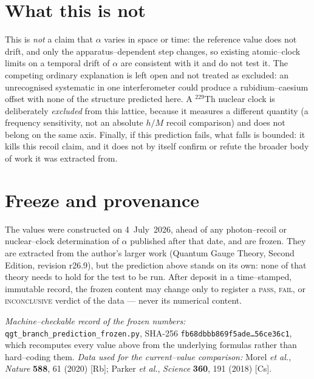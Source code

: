 \documentclass[11pt]{article}
\begin{document}
\section{What this is not}

This is \emph{not} a claim that $\alpha$ varies in space or time: the reference
value does not drift, and only the apparatus--dependent step changes, so existing
atomic--clock limits on a temporal drift of $\alpha$ are consistent with it and do
not test it. The competing ordinary explanation is left open and not treated as
excluded: an unrecognised systematic in one interferometer could produce a
rubidium--caesium offset with none of the structure predicted here. A $^{229}$Th
nuclear clock is deliberately \emph{excluded} from this lattice, because it
measures a different quantity (a frequency sensitivity, not an absolute
$h/M$ recoil comparison) and does not belong on the same axis. Finally, if this
prediction fails, what falls is bounded: it kills this recoil claim, and it does
not by itself confirm or refute the broader body of work it was extracted from.

\section*{Freeze and provenance}

The values were constructed on 4~July~2026, ahead of any photon--recoil or
nuclear--clock determination of $\alpha$ published after that date, and are
frozen. They are extracted from the author's larger work (Quantum Gauge Theory,
Second Edition, revision r26.9), but the prediction above stands on its own: none
of that theory needs to hold for the test to be run. After deposit in a
time--stamped, immutable record, the frozen content may change only to register a
\textsc{pass}, \textsc{fail}, or \textsc{inconclusive} verdict of the data ---
never its numerical content.

\medskip
\footnotesize\noindent\textit{Machine--checkable record of the frozen numbers:}
\texttt{qgt\_branch\_prediction\_frozen.py}, SHA-256
\texttt{fb68dbbb869f5ade\ldots56ce36c1}, which recomputes every value above from
the underlying formulas rather than hard--coding them.
\textit{Data used for the current--value comparison:} Morel \emph{et al.},
\textit{Nature} \textbf{588}, 61 (2020) [Rb]; Parker \emph{et al.},
\textit{Science} \textbf{360}, 191 (2018) [Cs].
\end{document}
